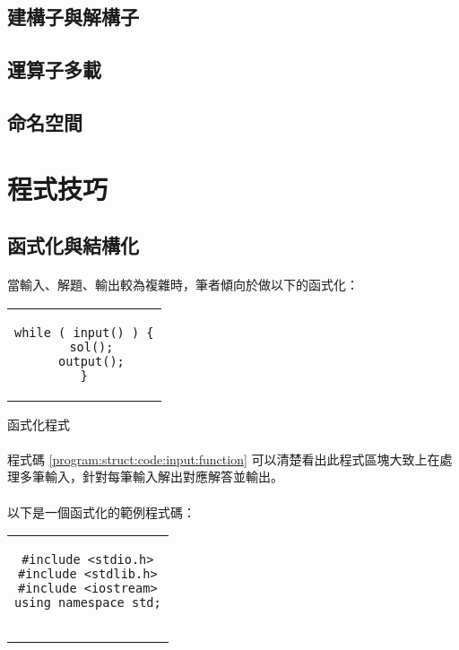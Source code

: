 \documentclass[12pt,a4paper,oneside]{report}
\begin{document}
\begin{CJK}{UTF8}{bkai}
\subsection{建構子與解構子}



\subsection{運算子多載}

\subsection{命名空間}

\section{程式技巧}

\subsection{函式化與結構化}

\paragraph{}當輸入、解題、輸出較為複雜時，筆者傾向於做以下的函式化：

\begin{code}[h!]
\centering
\begin{tabular}{c}
\begin{lstlisting}
while ( input() ) {
  sol();
  output();
}
\end{lstlisting}
\end{tabular}
\caption{函式化程式}
\label{program:struct:code:input:function}
\end{code}

\paragraph{}程式碼 \ref{program:struct:code:input:function} 可以清楚看出此程式區塊大致上在處理多筆輸入，針對每筆輸入解出對應解答並輸出。
\paragraph{}以下是一個函式化的範例程式碼：

\begin{code}[h!]
\centering
\begin{tabular}{c}
\begin{lstlisting}
#include <stdio.h>
#include <stdlib.h>
#include <iostream>
using namespace std;


\end{lstlisting}
\end{tabular}
\end{code}
\end{CJK}
\end{document}
